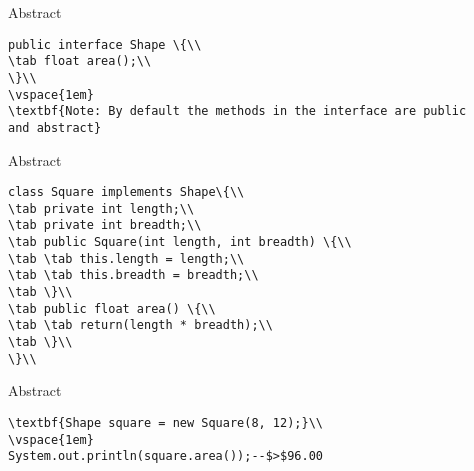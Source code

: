 \documentclass[aspectratio=169,14pt,usenames,dvipsnames]{beamer}
\newcommand\tab[1][1cm]{\hspace*{#1}}
\begin{document}
\begin{frame}{Abstract}
\begin{lstlisting}
public interface Shape \{\\
\tab float area();\\
\}\\
\vspace{1em}
\textbf{Note: By default the methods in the interface are public
and abstract}
\end{lstlisting}
\end{frame}

\begin{frame}{Abstract}
\begin{lstlisting}
class Square implements Shape\{\\
\tab private int length;\\
\tab private int breadth;\\
\tab public Square(int length, int breadth) \{\\
\tab \tab this.length = length;\\
\tab \tab this.breadth = breadth;\\
\tab \}\\
\tab public float area() \{\\
\tab \tab return(length * breadth);\\
\tab \}\\
\}\\
\end{lstlisting}
\end{frame}

\begin{frame}{Abstract}
\begin{lstlisting}
\textbf{Shape square = new Square(8, 12);}\\
\vspace{1em}
System.out.println(square.area());--$>$96.00
\end{lstlisting}
\end{frame}
\end{document}
